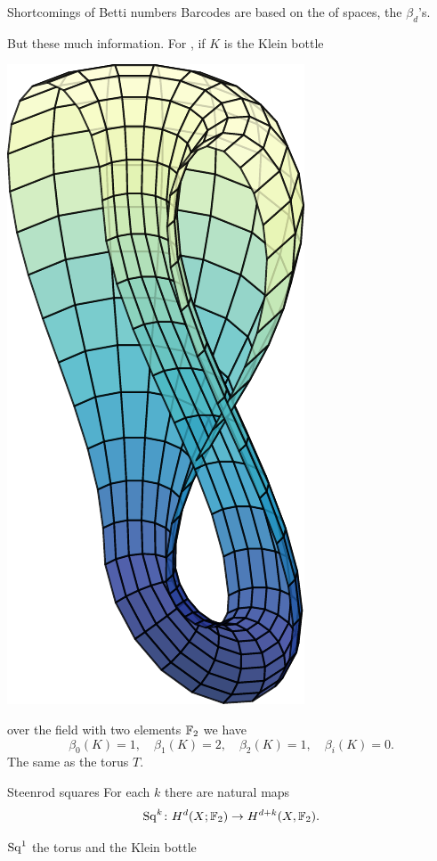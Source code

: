 \begin{frame}{Shortcomings of Betti numbers}
	\pause
	Barcodes are based on the  of spaces, the $\beta_d$'s.

	\pause\medskip
	But these  much information.
	\pause For , if $K$ is the Klein bottle
	\begin{center}
		\includegraphics[scale=.3]{aux/KB.pdf}
	\end{center}
	over the field with two elements ${\mathbb{F}_2}$ we have
	\[
	\beta_0(K) = 1, \quad \beta_1(K) = 2, \quad \beta_2(K) = 1, \quad \beta_i(K) = 0.
	\]
	The same as the torus $T$.
\end{frame}

\begin{frame}{Steenrod squares}
	\pause
	For each $k$ there are natural maps
	\[
	\operatorname{Sq}^k \colon H^d(X;{\mathbb{F}_2}) \to H^{d+k}(X,{\mathbb{F}_2}).
	\]

	\pause
	$\operatorname{Sq}^1$  the torus and the Klein bottle
	\begin{figure}
	\end{figure}
\end{frame}

